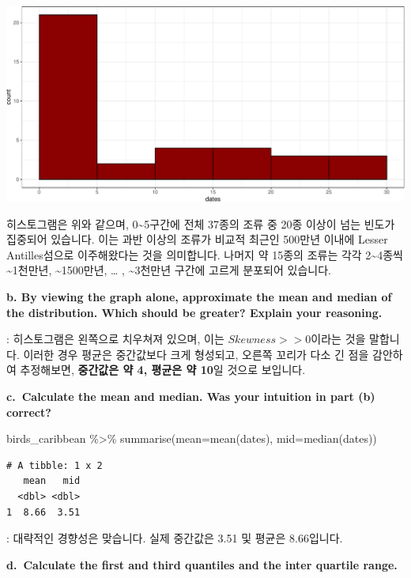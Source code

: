 \documentclass[
  a4paper,
  DIV=11,
  numbers=noendperiod]{scrreprt}
\newenvironment{Shaded}{\begin{snugshade}}{\end{snugshade}}
\newcommand{\AttributeTok}[1]{\textcolor[rgb]{0.40,0.45,0.13}{#1}}
\newcommand{\FunctionTok}[1]{\textcolor[rgb]{0.28,0.35,0.67}{#1}}
\newcommand{\NormalTok}[1]{\textcolor[rgb]{0.00,0.23,0.31}{#1}}
\newcommand{\SpecialCharTok}[1]{\textcolor[rgb]{0.37,0.37,0.37}{#1}}
\begin{document}
\includegraphics{경영통계분석_hw1_files/figure-pdf/unnamed-chunk-3-1.pdf}

히스토그램은 위와 같으며, 0\textasciitilde5구간에 전체 37종의 조류 중
20종 이상이 넘는 빈도가 집중되어 있습니다. 이는 과반 이상의 조류가
비교적 최근인 500만년 이내에 Lesser Antilles섬으로 이주해왔다는 것을
의미합니다. 나머지 약 15종의 조류는 각각 2\textasciitilde4종씩
\textasciitilde1천만년, \textasciitilde1500만년, \ldots{} ,
\textasciitilde3천만년 구간에 고르게 분포되어 있습니다.

\textbf{b. By viewing the graph alone, approximate the mean and median
of the distribution. Which should be greater? Explain your reasoning.}

: 히스토그램은 왼쪽으로 치우쳐져 있으며, 이는 \(Skewness>>0\)이라는 것을
말합니다. 이러한 경우 평균은 중간값보다 크게 형성되고, 오른쪽 꼬리가
다소 긴 점을 감안하여 추정해보면, \textbf{중간값은 약 4, 평균은 약 10}일
것으로 보입니다.

\textbf{c.~Calculate the mean and median. Was your intuition in part (b)
correct?}

\begin{Shaded}
\begin{Highlighting}[]
\NormalTok{birds\_caribbean }\SpecialCharTok{\%\textgreater{}\%} 
  \FunctionTok{summarise}\NormalTok{(}\AttributeTok{mean=}\FunctionTok{mean}\NormalTok{(dates),}
            \AttributeTok{mid=}\FunctionTok{median}\NormalTok{(dates))}
\end{Highlighting}
\end{Shaded}

\begin{verbatim}
# A tibble: 1 x 2
   mean   mid
  <dbl> <dbl>
1  8.66  3.51
\end{verbatim}

: 대략적인 경향성은 맞습니다. 실제 중간값은 3.51 및 평균은 8.66입니다.

\textbf{d.~Calculate the first and third quantiles and the inter
quartile range.}
\end{document}
